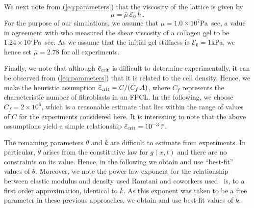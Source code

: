 
We next note from (\ref{eq:parameters}) that the viscosity of the lattice is given by
\begin{equation}
\mu=\bar{\mu}\,\mathcal{E}_{0}\,h\,.
\label{eq:viscosity}
\end{equation}
For the purpose of our simulations, we assume that $\mu=1.0\times 10^{7}$Pa~sec, a value in agreement with \citet{Knapp1997} who measured the shear viscosity of a collagen gel to be $1.24\times 10^{7}$Pa~sec. As we assume that the initial gel stiffness is $\mathcal{E}_{0}=1$kPa, we hence  set $\bar{\mu}=2.78$ for all experiments.

Finally, we note that although $\bar{e}_{\rm crit}$ is difficult to determine experimentally, it can be observed from (\ref{eq:parameters}) that it is related to the cell density. Hence, we make the heuristic  assumption $\bar{e}_{\rm crit} = C/(C_{f}\,A)$, where $C_{f}$ represents the characteristic number of fibroblasts in an FPCL. In the following, we choose $C_{f}=2\times 10^{6}$, which is a reasonable estimate that lies within the range of values of $C$ for the experiments considered here. It is interesting to note that the above assumptions yield a simple relationship $\bar{e}_{\rm crit}=10^{-3}\,\bar{\tau}$.

The remaining parameters $\bar{\theta}$ and $\bar{k}$ are difficult to estimate from experiments. In particular, $\bar{\theta}$ arises from the constitutive law for $g(x,t)$ and there are no constraints on its value. Hence, in the following we obtain and use ``best-fit'' values of $\bar{\theta}$. Moreover, we note the power law exponent for the relationship between elastic modulus and density used Ramtani and coworkers used~\citep{Ramtani2002,Ramtani2004} is, to a first order approximation, identical to $\bar{k}$. As this exponent was taken to be a free parameter in these previous approaches, we obtain and use best-fit values of $\bar{k}$.

